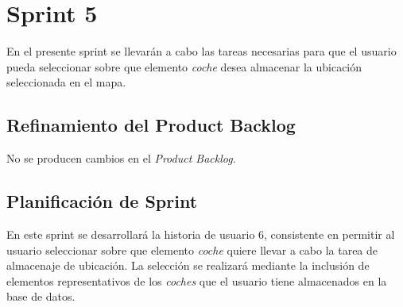\section{Sprint 5}
	En el presente sprint se llevarán a cabo las tareas necesarias para que el usuario pueda seleccionar sobre que elemento \textit{coche} desea almacenar la ubicación seleccionada en el mapa.
	\subsection{Refinamiento del Product Backlog}
	No se producen cambios en el \textit{Product Backlog}.
	
	\subsection{Planificación de Sprint}
	En este sprint se desarrollará la historia de usuario 6, consistente en permitir al usuario seleccionar sobre que elemento \textit{coche} quiere llevar a cabo la tarea de almacenaje de ubicación. La selección se realizará mediante la inclusión de elementos representativos de los \textit{coches} que el usuario tiene almacenados en la base de datos.
	
